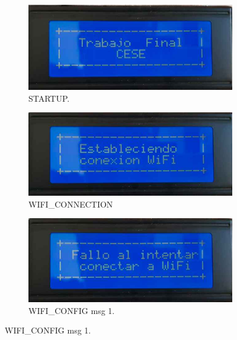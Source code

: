 \begin{figure}[!htpb]
     \centering
     \begin{subfigure}[b]{0.4\textwidth}
         \centering
         \includegraphics[width=1.1\textwidth]{./Figures/Bienvenida.jpeg}
         \caption{STARTUP.}
         \label{fig:pruIni_1_1}
     \end{subfigure}
     \hfill
     \begin{subfigure}[b]{0.4\textwidth}
         \centering
         \includegraphics[width=1.1\textwidth]{./Figures/Esta_conex_WiFi.jpeg}
         \caption{WIFI\_CONNECTION}
         \label{fig:pruIni_1_2}
     \end{subfigure}
          \hfill
     \begin{subfigure}[b]{0.4\textwidth}
         \centering
         \includegraphics[width=1.1\textwidth]{./Figures/Fallo_con_WiFi.jpeg}
         \caption{WIFI\_CONFIG msg 1.}
         \label{fig:pruIni_1_3}

\end{subfigure}
\end{figure}
